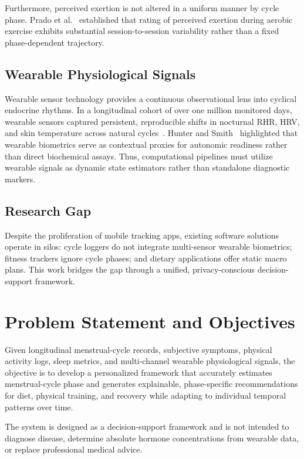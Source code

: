 \documentclass[conference]{IEEEtran}
\begin{document}
Furthermore, perceived exertion is not altered in a uniform manner by cycle phase. Prado et al.~\cite{prado2024} established that rating of perceived exertion during aerobic exercise exhibits substantial session-to-session variability rather than a fixed phase-dependent trajectory.

\subsection{Wearable Physiological Signals}
Wearable sensor technology provides a continuous observational lens into cyclical endocrine rhythms. In a longitudinal cohort of over one million monitored days, wearable sensors captured persistent, reproducible shifts in nocturnal RHR, HRV, and skin temperature across natural cycles~\cite{smarr2026}. Hunter and Smith~\cite{hunter2024} highlighted that wearable biometrics serve as contextual proxies for autonomic readiness rather than direct biochemical assays. Thus, computational pipelines must utilize wearable signals as dynamic state estimators rather than standalone diagnostic markers.

\subsection{Research Gap}
Despite the proliferation of mobile tracking apps, existing software solutions operate in silos: cycle loggers do not integrate multi-sensor wearable biometrics; fitness trackers ignore cycle phases; and dietary applications offer static macro plans. This work bridges the gap through a unified, privacy-conscious decision-support framework.

\section{Problem Statement and Objectives}
Given longitudinal menstrual-cycle records, subjective symptoms, physical activity logs, sleep metrics, and multi-channel wearable physiological signals, the objective is to develop a personalized framework that accurately estimates menstrual-cycle phase and generates explainable, phase-specific recommendations for diet, physical training, and recovery while adapting to individual temporal patterns over time.

The system is designed as a decision-support framework and is not intended to diagnose disease, determine absolute hormone concentrations from wearable data, or replace professional medical advice.
\end{document}
